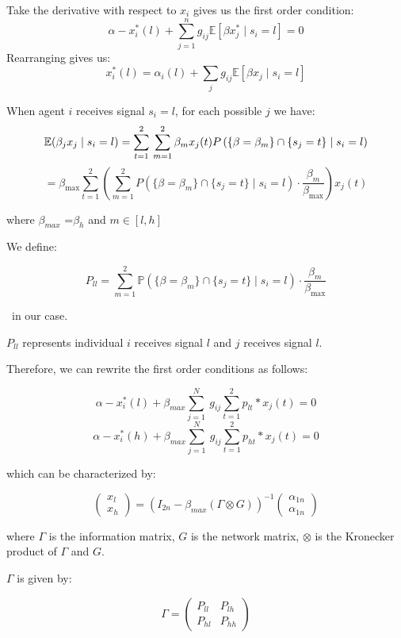 \documentclass[12pt]{article}
\begin{document}
Take the derivative with respect to $x_i$ gives us the first order condition:
\[
\alpha -x_i^*(l) +\sum_{j=1}^{n} g_{ij} \mathbb{E}[\beta x_j^* \mid s_i = l]=0
\]
Rearranging gives us:
\[
x^*_i(l) = \alpha_i(l) + \sum_j g_{ij} \mathbb{E}[\beta x_j \mid s_i = l]
\]



When agent $i$ receives signal $s_i =l$, for each possible $j$ we have:
\[
\mathbb{E}(\beta_j x_j \mid s_i = l) = \sum_{t=1}^{2} \\
\sum_{m=1}^{2} \beta_m x_j(t) P\left( \{\beta = \beta_m\} \cap \{s_j = t\} \mid s_i = l \right)
\]
\[
= \beta_{\max} \sum_{t=1}^{2} \left(\sum_{m=1}^2 P\left( \{\beta = \beta_m\} \cap \{s_j = t\} \mid s_i = l \right) \cdot \frac{\beta_m}{\beta_{\max}} \right)x_j(t)
\]

where $\beta_{max}$ =$\beta_h$ and $m\in[l,h]$

We define:

\[
P_{ll} = \sum_{m=1}^2 \mathbb{P}(\{\beta = \beta_m \}\cap \{s_j = t\} \mid s_i = l) \cdot \frac{\beta_m}{\beta_{\max}}
\]

 \  in our case.

$P_{ll}$ represents individual $i$ receives signal $l$ and $j$ receives signal $l$.

Therefore, we can rewrite the first order conditions as follows:

\[
\alpha - x_i ^*(l)+ \beta_{max}  \sum_{j=1}^{N}\ g_{ij} \sum_{t=1}^{2}p_{lt}*x_j(t)=0
\]
\[
\alpha - x_i ^*(h)+ \beta_{max}  \sum_{j=1}^{N}\ g_{ij} \sum_{t=1}^{2}p_{ht}*x_j(t)=0
\]

which can be characterized by:

\[
\begin{pmatrix}
x_l \\
x_h
\end{pmatrix}
= \left( I_{2n} - \beta_{max} (\Gamma\otimes G) \right)^{-1}
\begin{pmatrix}
\alpha_{1n} \\
\alpha_{1n}
\end{pmatrix}
\]

where $\Gamma$ is the information matrix, $G$ is the network matrix, $\otimes$ is the Kronecker product of $\Gamma$ and $G$.

$\Gamma$ is given by:

\[
\Gamma = 
\begin{pmatrix}
P_{ll} & P_{lh} \\
P_{hl} & P_{hh}
\end{pmatrix}
\]
\end{document}
